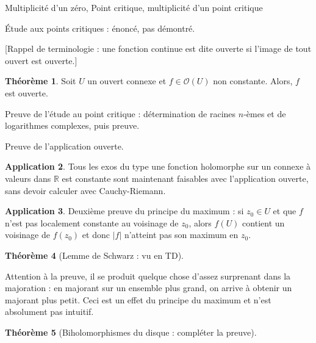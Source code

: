 \documentclass[11pt,a4paper]{book}
\newcommand{\R}{\mathbb{R}}
\theoremstyle{definition}
\newtheorem{theoreme}{Th\'eor\`eme}[section]
\newtheorem{application}[theoreme]{Application}
\theoremstyle{plain}
\begin{document}

Multiplicité d'un zéro, 
Point critique, multiplicité d'un point critique

Étude aux points critiques : énoncé, pas démontré.

[Rappel de terminologie : une fonction continue est dite ouverte si l'image de tout ouvert est ouverte.]

\begin{theoreme}
Soit $U$ un ouvert connexe et $f\in \mathcal O(U)$ non constante.
Alors, $f$ est ouverte.
\end{theoreme}



Preuve de l'étude au point critique : détermination de racines $n$-èmes et de logarithmes complexes, puis preuve.

Preuve de l'application ouverte.

\begin{application}
Tous les exos du type \og une fonction holomorphe sur un connexe à valeurs dans $\R$ est constante\fg{} sont maintenant faisables avec l'application ouverte, sans devoir calculer avec Cauchy-Riemann.
\end{application}

\begin{application}
Deuxième preuve du principe du maximum : si $z_0 \in U$ et que $f$ n'est pas localement constante au voisinage de $z_0$, alors $f(U)$ contient un voisinage de $f(z_0)$ et donc $|f|$ n'atteint pas son maximum en $z_0$.
\end{application}


\begin{theoreme}[Lemme de Schwarz : vu en TD]
\end{theoreme}

Attention à la preuve, il se produit quelque chose d'assez surprenant dans la majoration : en majorant sur un ensemble plus grand,  on arrive à obtenir un majorant plus petit. Ceci est un effet du principe du maximum et n'est absolument pas intuitif.



\begin{theoreme}[Biholomorphismes du disque : compléter la preuve]
\end{theoreme}
\end{document}
